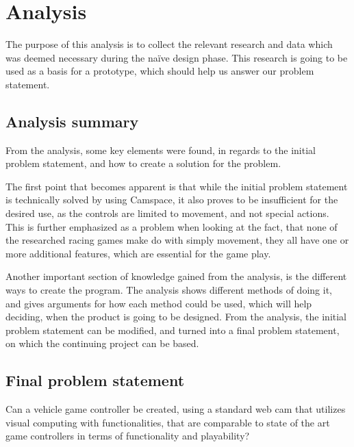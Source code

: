 \section{Analysis} \label{sec:analysis}
The purpose of this analysis is to collect the relevant research and data which was deemed necessary during the naïve design phase. This research is going to be used as a basis for a prototype, which should help us answer our problem statement. 










\subsection{Analysis summary}
From the analysis, some key elements were found, in regards to the initial problem statement, and how to create a solution for the problem.

The first point that becomes apparent is that while the initial problem statement is technically solved by using Camspace, it also proves to be insufficient for the desired use, as the controls are limited to movement, and not special actions. This is further emphasized as a problem when looking at the fact, that none of the researched racing games make do with simply movement, they all have one or more additional features, which are essential for the game play.

Another important section of knowledge gained from the analysis, is the different ways to create the program. The analysis shows different methods of doing it, and gives arguments for how each method could be used, which will help deciding, when the product is going to be designed.
From the analysis, the initial problem statement can be modified, and turned into a final problem statement, on which the continuing project can be based.


\subsection{Final problem statement}
Can a vehicle game controller be created, using a standard web cam that utilizes visual computing with functionalities, that are comparable to state of the art game controllers in terms of functionality and playability?